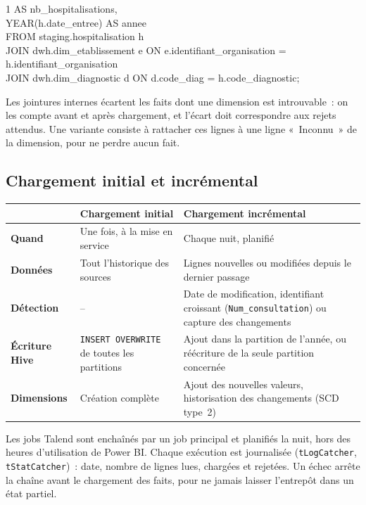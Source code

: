 \begin{center}
\begin{minipage}{0.92\textwidth}
\begin{tcolorbox}[colback=title2!6,colframe=title1,title=\textbf{Fait Hospitalisation}~: clés des dimensions et mesures,fonttitle=\small,boxsep=2pt]
\hspace*{3.2em}1 AS nb\_hospitalisations,\\
\hspace*{3.2em}YEAR(h.date\_entree) AS annee\\
FROM staging.hospitalisation h\\
JOIN dwh.dim\_etablissement e ON e.identifiant\_organisation = h.identifiant\_organisation\\
JOIN dwh.dim\_diagnostic d \hspace*{1.6em}ON d.code\_diag = h.code\_diagnostic;
\end{tcolorbox}
\end{minipage}
\end{center}

\noindent Les jointures internes écartent les faits dont une dimension est introuvable~: on les compte avant et après chargement, et l'écart doit correspondre aux rejets attendus. Une variante consiste à rattacher ces lignes à une ligne «~Inconnu~» de la dimension, pour ne perdre aucun fait.

\subsection{Chargement initial et incrémental}

\begin{center}
\begin{tabularx}{\textwidth}{>{\bfseries}l >{\raggedright\arraybackslash}X >{\raggedright\arraybackslash}X}
\toprule
 & Chargement initial & Chargement incrémental \\
\midrule
Quand & Une fois, à la mise en service & Chaque nuit, planifié \\
Données & Tout l'historique des sources & Lignes nouvelles ou modifiées depuis le dernier passage \\
Détection & -- & Date de modification, identifiant croissant (\texttt{Num\_consultation}) ou capture des changements \\
Écriture Hive & \texttt{INSERT OVERWRITE} de toutes les partitions & Ajout dans la partition de l'année, ou réécriture de la seule partition concernée \\
Dimensions & Création complète & Ajout des nouvelles valeurs, historisation des changements (SCD type~2) \\
\bottomrule
\end{tabularx}
\end{center}

\noindent Les jobs Talend sont enchaînés par un job principal et planifiés la nuit, hors des heures d'utilisation de Power BI. Chaque exécution est journalisée (\texttt{tLogCatcher}, \texttt{tStatCatcher})~: date, nombre de lignes lues, chargées et rejetées. Un échec arrête la chaîne avant le chargement des faits, pour ne jamais laisser l'entrepôt dans un état partiel.

